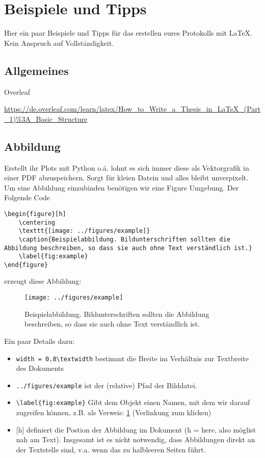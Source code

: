 \documentclass[twoside, 11pt, ngerman, a4paper, biblography=totoc]{scrartcl}
\begin{document}
\section{Beispiele und Tipps}
Hier ein paar Beispiele und Tipps für das erstellen eures Protokolls mit \LaTeX. Kein Anspruch auf Vollständigkeit.

\subsection{Allgemeines}
Overleaf

\url{https://de.overleaf.com/learn/latex/How_to_Write_a_Thesis_in_LaTeX_(Part_1)\%3A_Basic_Structure}

\subsection{Abbildung}
Erstellt ihr Plots mit Python o.ä. lohnt es sich immer diese als Vektorgrafik in einer PDF abzuspeichern. Sorgt für kleien Datein und alles bleibt unverpixelt.\\

Um eine Abbildung einzubinden benötigen wir eine Figure Umgebung. Der Folgende Code
\begin{lstlisting}[language=Tex]
\begin{figure}[h]
    \centering
    \texttt{[image: ../figures/example]}
    \caption{Beispielabbildung. Bildunterschriften sollten die Abbildung beschreiben, so dass sie auch ohne Text verständlich ist.}
    \label{fig:example}
\end{figure}
\end{lstlisting}
erzeugt diese Abbildung:
\begin{figure}[h]
    \centering
    \texttt{[image: ../figures/example]}
    \caption{Beispielabbildung. Bildunterschriften sollten die Abbildung beschreiben, so dass sie auch ohne Text verständlich ist.}
    \label{fig:example}
\end{figure}

Ein paar Details dazu:
\begin{itemize}
	\item \texttt{width = 0.8\textbackslash textwidth} bestimmt die Breite im Verhältnis zur Textbreite des Dokuments
	\item \texttt{../figures/example} ist der (relative) Pfad der Bilddatei. 
	\item \texttt{\textbackslash label\{fig:example\}} Gibt dem Objekt einen Namen, mit dem wir darauf zugreifen können, z.B. als Verweis: \cref{fig:example} (Verlinkung zum klicken)
	\item $[$h$]$ definiert die Postion der Abbildung im Dokument (h = here, also möglist nah am Text). Insgesamt ist es nicht notwendig, dass Abbildungen direkt an der Textstelle sind, v.a. wenn das zu halbleeren Seiten führt.
\end{itemize}
\end{document}
